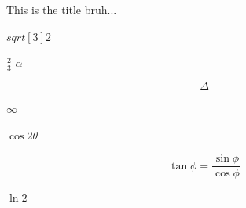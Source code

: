 \documentclass{article}
\begin{document}
    
    This is the title bruh...
    

    $sqrt[3]{2}$

    $\displaystyle{\frac{2}{3}}$
    $\alpha$


    $$\Delta$$

    $\infty$

    $\cos 2\theta$

    $$\tan \phi = \frac{\sin \phi}{\cos \phi}$$

    $\ln{2}$
    
    
\end{document}
